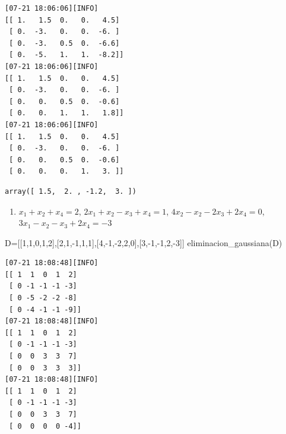\documentclass[
  letterpaper,
  DIV=11,
  numbers=noendperiod]{scrartcl}
\newenvironment{Shaded}{\begin{snugshade}}{\end{snugshade}}
\newcommand{\DecValTok}[1]{\textcolor[rgb]{0.68,0.00,0.00}{#1}}
\newcommand{\NormalTok}[1]{\textcolor[rgb]{0.00,0.23,0.31}{#1}}
\newcommand{\OperatorTok}[1]{\textcolor[rgb]{0.37,0.37,0.37}{#1}}
\providecommand{\tightlist}{%
  \setlength{\itemsep}{0pt}\setlength{\parskip}{0pt}}\usepackage{longtable,booktabs,array}
\begin{document}
\begin{verbatim}
[07-21 18:06:06][INFO] 
[[ 1.   1.5  0.   0.   4.5]
 [ 0.  -3.   0.   0.  -6. ]
 [ 0.  -3.   0.5  0.  -6.6]
 [ 0.  -5.   1.   1.  -8.2]]
[07-21 18:06:06][INFO] 
[[ 1.   1.5  0.   0.   4.5]
 [ 0.  -3.   0.   0.  -6. ]
 [ 0.   0.   0.5  0.  -0.6]
 [ 0.   0.   1.   1.   1.8]]
[07-21 18:06:06][INFO] 
[[ 1.   1.5  0.   0.   4.5]
 [ 0.  -3.   0.   0.  -6. ]
 [ 0.   0.   0.5  0.  -0.6]
 [ 0.   0.   0.   1.   3. ]]
\end{verbatim}

\begin{verbatim}
array([ 1.5,  2. , -1.2,  3. ])
\end{verbatim}

\begin{enumerate}
\def\labelenumi{\alph{enumi}.}
\setcounter{enumi}{3}
\tightlist
\item
  \(x_1 + x_2 +x_4= 2\), \(2x_1+x_2-x_3+x_4 = 1\),
  \(4x_2 -x_2-2 x_3+2x_4 = 0\), \(3x_1-x_2-x_3+2x_4=-3\)
\end{enumerate}

\begin{Shaded}
\begin{Highlighting}[]
\NormalTok{D}\OperatorTok{=}\NormalTok{[[}\DecValTok{1}\NormalTok{,}\DecValTok{1}\NormalTok{,}\DecValTok{0}\NormalTok{,}\DecValTok{1}\NormalTok{,}\DecValTok{2}\NormalTok{],[}\DecValTok{2}\NormalTok{,}\DecValTok{1}\NormalTok{,}\OperatorTok{{-}}\DecValTok{1}\NormalTok{,}\DecValTok{1}\NormalTok{,}\DecValTok{1}\NormalTok{],[}\DecValTok{4}\NormalTok{,}\OperatorTok{{-}}\DecValTok{1}\NormalTok{,}\OperatorTok{{-}}\DecValTok{2}\NormalTok{,}\DecValTok{2}\NormalTok{,}\DecValTok{0}\NormalTok{],[}\DecValTok{3}\NormalTok{,}\OperatorTok{{-}}\DecValTok{1}\NormalTok{,}\OperatorTok{{-}}\DecValTok{1}\NormalTok{,}\DecValTok{2}\NormalTok{,}\OperatorTok{{-}}\DecValTok{3}\NormalTok{]]}
\NormalTok{eliminacion\_gaussiana(D)}
\end{Highlighting}
\end{Shaded}

\begin{verbatim}
[07-21 18:08:48][INFO] 
[[ 1  1  0  1  2]
 [ 0 -1 -1 -1 -3]
 [ 0 -5 -2 -2 -8]
 [ 0 -4 -1 -1 -9]]
[07-21 18:08:48][INFO] 
[[ 1  1  0  1  2]
 [ 0 -1 -1 -1 -3]
 [ 0  0  3  3  7]
 [ 0  0  3  3  3]]
[07-21 18:08:48][INFO] 
[[ 1  1  0  1  2]
 [ 0 -1 -1 -1 -3]
 [ 0  0  3  3  7]
 [ 0  0  0  0 -4]]
\end{verbatim}
\end{document}
